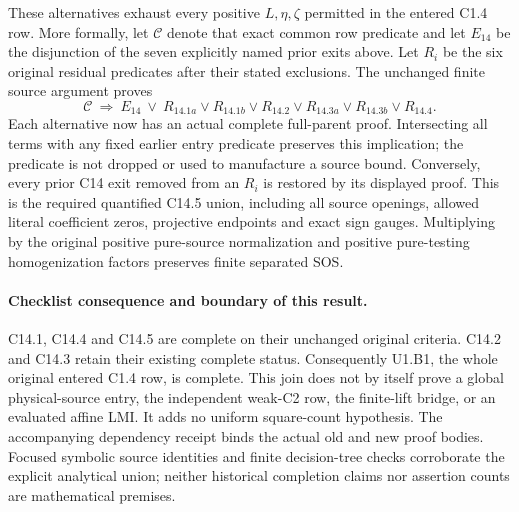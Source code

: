 These alternatives exhaust every positive $L,\eta,\zeta$ permitted
in the entered C1.4 row.  More formally, let $\mathcal C$ denote
that exact common row predicate and let $E_{14}$ be the disjunction
of the seven explicitly named prior exits above.  Let $R_i$ be the
six original residual predicates after their stated exclusions.
The unchanged finite source argument proves
\[
 \mathcal C\ \Longrightarrow\ E_{14}\ \lor\
 R_{14.1a}\lor R_{14.1b}\lor R_{14.2}\lor
 R_{14.3a}\lor R_{14.3b}\lor R_{14.4}.              \tag{JC7}
\]
Each alternative now has an actual complete full-parent proof.
Intersecting all terms with any fixed earlier entry predicate
preserves this implication; the predicate is not dropped or used
to manufacture a source bound.  Conversely, every prior C14 exit
removed from an $R_i$ is restored by its displayed proof.  This is
the required quantified C14.5 union, including all source openings,
allowed literal coefficient zeros, projective endpoints and exact
sign gauges.  Multiplying by the original positive pure-source
normalization and positive pure-testing homogenization factors
preserves finite separated SOS.

\paragraph{Checklist consequence and boundary of this result.}
C14.1, C14.4 and C14.5 are complete on their unchanged original
criteria.  C14.2 and C14.3 retain their existing complete status.
Consequently U1.B1, the whole original entered C1.4 row, is complete.
This join does not by itself prove a global physical-source entry,
the independent weak-C2 row, the finite-lift bridge, or an evaluated
affine LMI.  It adds no uniform square-count hypothesis.
The accompanying dependency receipt binds the actual old and new
proof bodies.  Focused symbolic source identities and finite
decision-tree checks corroborate the explicit analytical union;
neither historical completion claims nor assertion counts are
mathematical premises.
